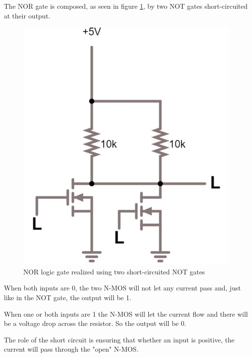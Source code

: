 \documentclass{article}
\begin{document}
\vspace{1mm}

The NOR gate is composed, as seen in figure \ref{NOR_N-MOS}, by two NOT gates short-circuited at their output.

\begin{figure}[h]
    \centering
    \includegraphics[scale=.3]{IM_NOR_NMOS.JPG}
    \caption{NOR logic gate realized using two short-circuited NOT gates}
    \label{NOR_N-MOS}
\end{figure}

When both inputs are 0, the two N-MOS will not let any current pass and, just like in the NOT gate, the output will be 1.

\vspace{1mm}

When one or both inputs are 1 the N-MOS will let the current flow and there will be a voltage drop across the resistor. So the output will be 0.

\vspace{1mm}

The role of the short circuit is ensuring that whether an input is positive, the current will pass through the "open" N-MOS.
\end{document}
